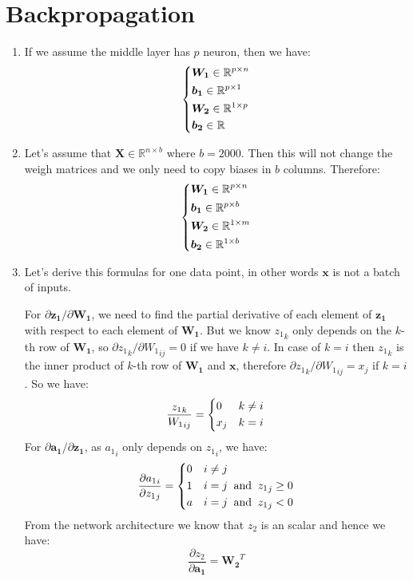 \documentclass[12]{article}
\begin{document}
	\section{Backpropagation}
	\begin{enumerate}[label=\textbf{(\alph*)}]
		\item
		If we assume the middle layer has $p$ neuron, then we have:
		\[
		\begin{dcases}
			\bm{W_1} \in \mathbb{R}^{p\times n} \\
			\bm{b_1} \in \mathbb{R}^{p\times 1} \\
			\bm{W_2} \in \mathbb{R}^{1\times p} \\
			\bm{b_2} \in \mathbb{R}
		\end{dcases}
		\]
		\item
		Let's assume that $\bm{X} \in \mathbb{R}^{n\times b}$ where $b=2000$. Then this will not change the weigh matrices and we only need to copy biases in $b$ columns. Therefore:
		\[
		\begin{dcases}
			\bm{W_1} \in \mathbb{R}^{p\times n} \\
			\bm{b_1} \in \mathbb{R}^{p\times b} \\
			\bm{W_2} \in \mathbb{R}^{1\times m} \\
			\bm{b_2} \in \mathbb{R}^{1\times b}
		\end{dcases}
		\]
		\item
		Let's derive this formulas for one data point, in other words $\bm{x}$ is not a batch of inputs.
		
		For $\partial \bm{z_1}/\partial \bm{W_1}$, we need to find the partial derivative of each element of $\bm{z_1}$ with respect to each element of $\bm{W_1}$. But we know ${z_1}_k$ only depends on the $k$-th row of $\bm{W_1}$, so $\partial {z_1}_k / \partial {W_1}_{ij} = 0$ if we have $k \ne i$. In case of $k = i$ then ${z_1}_k$ is the inner product of $k$-th row of $\bm{W_1}$ and $\bm{x}$, therefore $\partial {z_1}_k / \partial {W_1}_{ij} = x_j$ if $k = i$. So we have:
		\[
		\frac{{z_1}_k}{{W_1}_{ij}} = \begin{dcases}
			0 & k \ne i \\
			x_j & k = i
		\end{dcases}
		\]
		For $\partial{\bm{a_1}}/\partial{\bm{z_1}}$, as ${a_1}_i$ only depends on ${z_1}_i$, we have:
		\[
		\frac{\partial{a_1}_i}{\partial{z_1}_j} = \begin{dcases}
			0 & i \ne j \\
			1 & i = j \;\;\text{and}\;\; {z_1}_j \ge 0 \\
			a & i = j \;\;\text{and}\;\; {z_1}_j < 0
		\end{dcases} 
		\]
		From the network architecture we know that $z_2$ is an scalar and hence we have:
		\[
		\frac{\partial z_2}{\partial \bm{a_1}} = \bm{W_2}^T
		\]
		

\end{enumerate}
\end{document}
